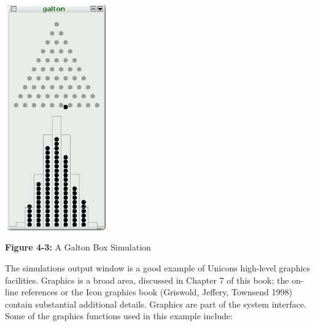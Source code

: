 \begin{center}
\includegraphics[width=1.75in,height=3.8201in]{ub-img/ub-img10.png}
\end{center}

{\sffamily\bfseries Figure 4-3:}
{\sffamily A Galton Box Simulation}

\bigskip

The simulation{\textquotesingle}s output window is a good example of
Unicon{\textquotesingle}s high-level graphics facilities. Graphics is a
broad area, discussed in Chapter 7 of this book; the on-line references
or the Icon graphics book (Griswold, Jeffery, Townsend 1998) contain
substantial additional details. Graphics are part of the system
interface. Some of the graphics functions used in this example include:

